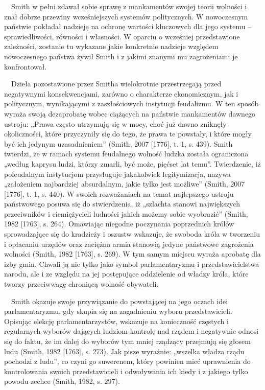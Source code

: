 \documentclass[a4paper]{article}
\begin{document}
 \ \ Smith w pełni zdawał sobie sprawę z mankamentów swojej teorii wolności i znał dobrze przewiny wcześniejszych systemów politycznych. W nowoczesnym państwie pokładał nadzieję na ochronę wartości kluczowych dla jego systemu – sprawiedliwości, równości i własności. W oparciu o wcześniej przedstawione zależności, zostanie tu wykazane jakie konkretnie nadzieje względem nowoczesnego państwa żywił Smith i z jakimi znanymi mu zagrożeniami je konfrontował.

\ \ Dzieła pozostawione przez Smitha wielokrotnie przestrzegają przed negatywnymi konsekwencjami, zarówno o charakterze ekonomicznym, jak i politycznym, wynikającymi z zaszłościowych instytucji feudalizmu. W ten sposób wyraża swoją dezaprobatę wobec ciążących na państwie mankamentów dawnego ustroju: „Prawa często utrzymują się w mocy, choć już dawno zniknęły okoliczności, które przyczyniły się do tego, że prawa te powstały, i które mogły być ich jedynym uzasadnieniem” \label{ref:RNDulI78tI5NW}(Smith, 2007 [1776], t. 1, s. 439). Smith twierdzi, że w ramach systemu feudalnego wolność ludzka została ograniczona „według kaprysu ludzi, którzy zmarli, być może, pięćset lat temu”. Twierdzenie, iż pofeudalnym instytucjom przysługuje jakakolwiek legitymizacja, nazywa „założeniem najbardziej absurdalnym, jakie tylko jest możliwe” \label{ref:RNDSUPttSQRMo}(Smith, 2007 [1776], t. 1, s. 440). W swoich rozważaniach na temat najlepszego ustroju państwowego posuwa się do stwierdzenia, iż „szlachta stanowi największych przeciwników i ciemiężycieli ludności jakich możemy sobie wyobrazić” \label{ref:RND0qdGYLZow2}(Smith, 1982 [1763], s. 264). Omawiając niegodne poczynania poprzednich królów sprowadzające się do kradzieży i oszustw wskazuje, że swoboda króla w tworzeniu i opłacaniu urzędów oraz zaciężna armia stanowią jedyne państwowe zagrożenia wolności \label{ref:RNDcctWJa8WzG}(Smith, 1982 [1763], s. 269). W tym samym miejscu wyraża aprobatę dla izby gmin. Chwali ją nie tylko jako symbol parlamentaryzmu i przedstawicielstwa narodu, ale i ze względu na jej postępujące oddzielenie od władzy króla, które tworzy przeciwwagę chroniącą wolność obywateli.

 \ \ Smith okazuje swoje przywiązanie do powstającej na jego oczach idei parlamentaryzmu, gdy skupia się na zagadnieniu wyboru przedstawicieli. Opisując elekcję parlamentarzystów, wskazuje na konieczność częstych i regularnych wyborów dających ludziom kontrolę nad rządem i negatywnie odnosi się do faktu, że im dalej do wyborów tym mniej rządzący przejmują się głosem ludu \label{ref:RNDGWDyLHaXiI}(Smith, 1982 [1763], s. 273). Jak pisze wyraźnie: „wszelka władza rządu pochodzi z ludu”, co czyni go suwerenem, który powinien mieć uprawnienia do kontrolowania swoich przedstawicieli i odwoływania ich kiedy i z jakiego tylko powodu zechce \label{ref:RND8CG5fqpymD}(Smith, 1982, s. 297).
\end{document}
